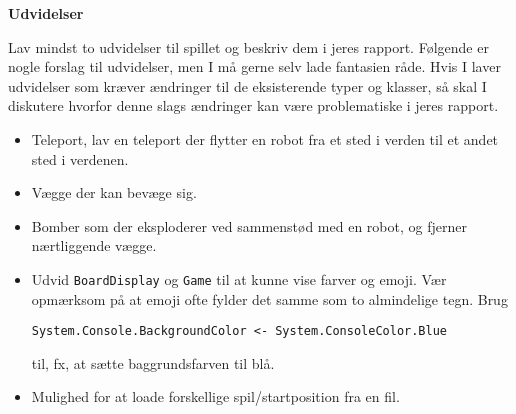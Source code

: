\textbf{Udvidelser}

Lav mindst to udvidelser til spillet og beskriv dem i jeres
rapport. Følgende er nogle forslag til udvidelser, men I må gerne selv lade
fantasien råde. Hvis I laver udvidelser som kræver ændringer til de
eksisterende typer og klasser, så skal I diskutere hvorfor denne slags
ændringer kan være problematiske i jeres rapport.

\begin{itemize}
\item Teleport, lav en teleport der flytter en robot fra et sted i
  verden til et andet sted i verdenen.
\item Vægge der kan bevæge sig.
\item Bomber som der eksploderer ved sammenstød med en robot, og
  fjerner nærtliggende vægge.
\item Udvid \lstinline{BoardDisplay} og \lstinline{Game} til at kunne
  vise farver og emoji. Vær opmærksom på at emoji ofte fylder det
  samme som to almindelige tegn. Brug
\begin{lstlisting}
System.Console.BackgroundColor <- System.ConsoleColor.Blue
\end{lstlisting}
  til, fx, at sætte baggrundsfarven til blå.
\item Mulighed for at loade forskellige spil/startposition fra en fil.
\end{itemize}

